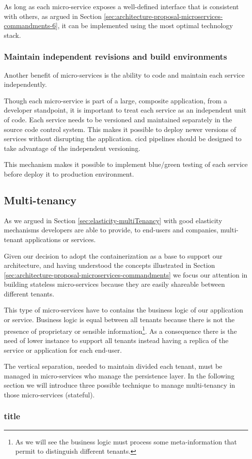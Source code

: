 As long as each micro-service exposes a well-defined interface that is consistent with others, as
argued in Section \ref{sec:architecture-proposal-microservices-commandments-6}, it can be implemented
using the most optimal technology stack.

\subsubsection*[Commandment 10]{Maintain independent revisions and build environments}
\label{sec:architecture-proposal-microservices-commandments-10}
Another benefit of micro-services is the ability to code and maintain each service independently.

Though each micro-service is part of a large, composite application, from a developer standpoint, it
is important to treat each service as an independent unit of code. Each service needs to be versioned
and maintained separately in the source code control system. This makes it possible to deploy newer
versions of services without disrupting the application. \ac{cicd} pipelines should be designed to
take advantage of the independent versioning.

This mechanism makes it possible to implement blue/green testing of each service before deploy it to
production environment.

\subsection{Multi-tenancy}
\label{sec:architecture-proposal-multiTenancy}
As we argued in Section \ref{sec:elasticity-multiTenancy} with good elasticity mechanisms developers
are able to provide, to end-users and companies, multi-tenant applications or services.

Given our decision to adopt the containerization as a base to support our architecture, and having 
understood the concepts illustrated in Section \ref{sec:architecture-proposal-microservices-commandments}
we focus our attention in building stateless micro-services because they are easily shareable between
different tenants.

This type of micro-services have to contains the business logic of our application or service. Business logic
is equal between all tenants because there is not the presence of proprietary or sensible information\footnote{
As we will see the business logic must process some meta-information that permit to distinguish different
tenants.}. As a consequence there is the need of lower instance to support all tenants instead having
a replica of the service or application for each end-user.

The vertical separation, needed to maintain divided each tenant, must be managed in micro-services who
manage the persistence layer. In the following section we will introduce three possible technique to manage
multi-tenancy in those micro-services (stateful).

\subsubsection{title}